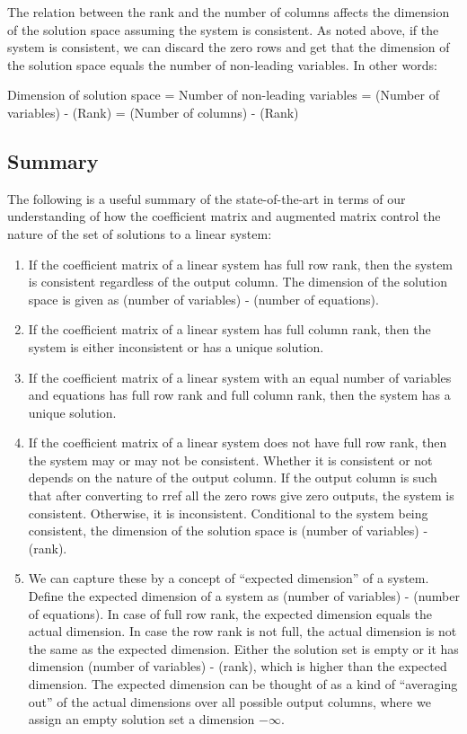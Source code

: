 \documentclass[10pt]{amsart}
\begin{document}
The relation between the rank and the number of columns affects the
dimension of the solution space assuming the system is consistent. As
noted above, if the system is consistent, we can discard the zero rows
and get that the dimension of the solution space equals the number of
non-leading variables. In other words:

Dimension of solution space = Number of non-leading variables =
(Number of variables) - (Rank) = (Number of columns) - (Rank)

\subsection{Summary}

The following is a useful summary of the state-of-the-art in terms of
our understanding of how the coefficient matrix and augmented matrix
control the nature of the set of solutions to a linear system:

\begin{enumerate}
\item If the coefficient matrix of a linear system has full row rank,
  then the system is consistent regardless of the output column. The
  dimension of the solution space is given as (number of variables) -
  (number of equations).
\item If the coefficient matrix of a linear system has full column
  rank, then the system is either inconsistent or has a unique
  solution.
\item If the coefficient matrix of a linear system with an equal
  number of variables and equations has full row rank and full column
  rank, then the system has a unique solution.
\item If the coefficient matrix of a linear system does not have full
  row rank, then the system may or may not be consistent. Whether it
  is consistent or not depends on the nature of the output column. If
  the output column is such that after converting to rref all the zero
  rows give zero outputs, the system is consistent. Otherwise, it is
  inconsistent. Conditional to the system being consistent, the
  dimension of the solution space is (number of variables) - (rank).
\item We can capture these by a concept of ``expected dimension'' of a
  system. Define the expected dimension of a system as (number of
  variables) - (number of equations). In case of full row rank, the
  expected dimension equals the actual dimension. In case the row rank
  is not full, the actual dimension is not the same as the expected
  dimension. Either the solution set is empty or it has dimension
  (number of variables) - (rank), which is higher than the expected
  dimension. The expected dimension can be thought of as a kind of
  ``averaging out'' of the actual dimensions over all possible output
  columns, where we assign an empty solution set a dimension
  $-\infty$.
\end{enumerate}
\end{document}
